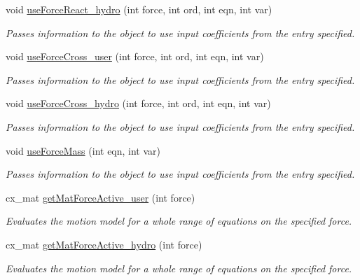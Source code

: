 \begin{DoxyCompactItemize}
void \hyperlink{classmotion_model_a7c5082d3b3f2a3eecd9abe17b68c2c89}{use\-Force\-React\-\_\-hydro} (int force, int ord, int eqn, int var)
\begin{DoxyCompactList}\small\item\em Passes information to the object to use input coefficients from the entry specified. \end{DoxyCompactList}\item 
void \hyperlink{classmotion_model_ad21c4a3b448d3e1c0d220eaac66964a2}{use\-Force\-Cross\-\_\-user} (int force, int ord, int eqn, int var)
\begin{DoxyCompactList}\small\item\em Passes information to the object to use input coefficients from the entry specified. \end{DoxyCompactList}\item 
void \hyperlink{classmotion_model_ad78f6dd283633ed6d42c6a1cac20f19d}{use\-Force\-Cross\-\_\-hydro} (int force, int ord, int eqn, int var)
\begin{DoxyCompactList}\small\item\em Passes information to the object to use input coefficients from the entry specified. \end{DoxyCompactList}\item 
void \hyperlink{classmotion_model_aaf9a010639b09706e24800dd3c2115c2}{use\-Force\-Mass} (int eqn, int var)
\begin{DoxyCompactList}\small\item\em Passes information to the object to use input coefficients from the entry specified. \end{DoxyCompactList}\item 
cx\-\_\-mat \hyperlink{classmotion_model_a260b6ac83eeaaa2daa6a1688a12d45dd}{get\-Mat\-Force\-Active\-\_\-user} (int force)
\begin{DoxyCompactList}\small\item\em Evaluates the motion model for a whole range of equations on the specified force. \end{DoxyCompactList}\item 
cx\-\_\-mat \hyperlink{classmotion_model_a01e4fe797797c1ce0d549d7fa7677672}{get\-Mat\-Force\-Active\-\_\-hydro} (int force)
\begin{DoxyCompactList}\small\item\em Evaluates the motion model for a whole range of equations on the specified force. \end{DoxyCompactList}\item 

\end{DoxyCompactItemize}
